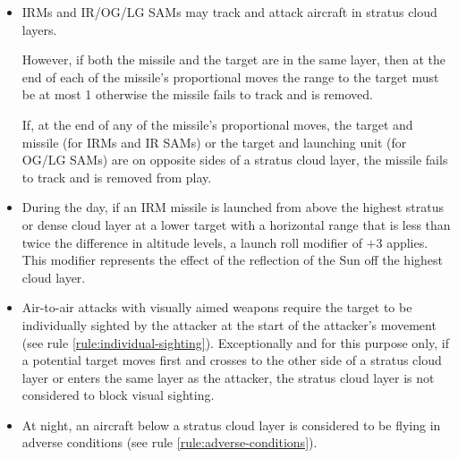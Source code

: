 \begin{advancedrules}
{\begin{itemize}
\begin{itemize}
\item
Aircraft in a stratus cloud layer can sight other aircraft and missiles with a modifier of $+2$.

\item Aircraft and missiles in a stratus cloud layer can be sighted by other aircraft with a modifier of $+3$. 

\end{itemize}
When an aircraft in a stratus cloud layer is searching for a target in the same layer, all of these modifiers apply.

\item{} IRMs and IR/OG/LG SAMs may track and attack aircraft in stratus cloud layers. 

However, if both the missile and the target are in the same layer, then at the end of each of the missile’s proportional moves the range to the target must be at most 1 otherwise the missile fails to track and is removed. 

If, at the end of any of the missile’s proportional moves, the target and missile (for IRMs and IR SAMs) or the target and launching unit (for OG/LG SAMs) are on opposite sides of a stratus cloud layer, the missile fails to track and is removed from play.

\item{} During the day, if an IRM missile is launched from above the highest stratus or dense cloud layer at a lower target with a horizontal range that is less than twice the difference in altitude levels, a launch roll modifier of $+3$ applies. This modifier represents the effect of the reflection of the Sun off the highest cloud layer.

\item{} Air-to-air attacks with visually aimed weapons require the target to be individually sighted by the attacker at the start of the attacker's movement (see rule \ref{rule:individual-sighting}). Exceptionally and for this purpose only, if a potential target moves first and crosses to the other side of a stratus cloud layer or enters the same layer as the attacker, the stratus cloud layer is not considered to block visual sighting.

\item{} At night, an aircraft below a stratus cloud layer is considered to be flying in adverse conditions (see rule \ref{rule:adverse-conditions}).


\end{itemize}}
\end{advancedrules}
